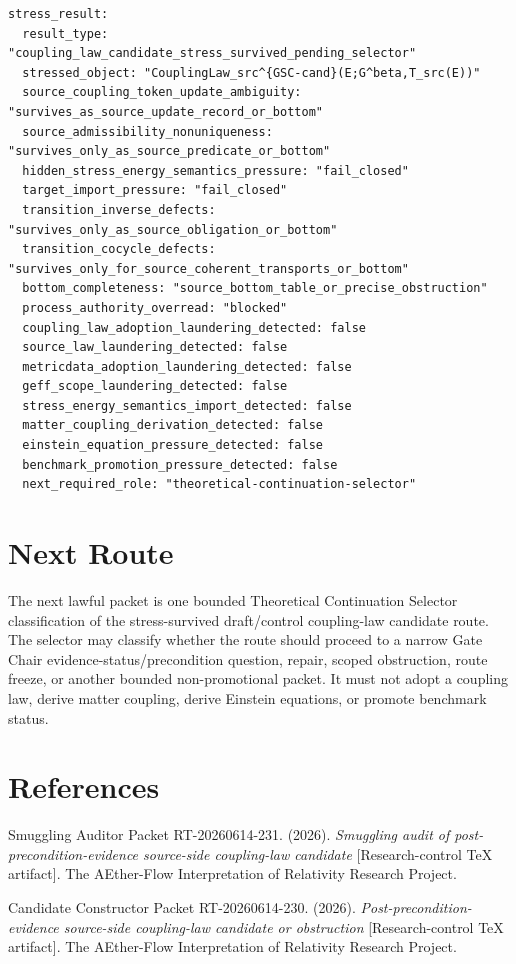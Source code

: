 \documentclass[11pt]{article}
\begin{document}
\begin{verbatim}
stress_result:
  result_type: "coupling_law_candidate_stress_survived_pending_selector"
  stressed_object: "CouplingLaw_src^{GSC-cand}(E;G^beta,T_src(E))"
  source_coupling_token_update_ambiguity: "survives_as_source_update_record_or_bottom"
  source_admissibility_nonuniqueness: "survives_only_as_source_predicate_or_bottom"
  hidden_stress_energy_semantics_pressure: "fail_closed"
  target_import_pressure: "fail_closed"
  transition_inverse_defects: "survives_only_as_source_obligation_or_bottom"
  transition_cocycle_defects: "survives_only_for_source_coherent_transports_or_bottom"
  bottom_completeness: "source_bottom_table_or_precise_obstruction"
  process_authority_overread: "blocked"
  coupling_law_adoption_laundering_detected: false
  source_law_laundering_detected: false
  metricdata_adoption_laundering_detected: false
  geff_scope_laundering_detected: false
  stress_energy_semantics_import_detected: false
  matter_coupling_derivation_detected: false
  einstein_equation_pressure_detected: false
  benchmark_promotion_pressure_detected: false
  next_required_role: "theoretical-continuation-selector"
\end{verbatim}

\section{Next Route}

The next lawful packet is one bounded Theoretical Continuation Selector
classification of the stress-survived draft/control coupling-law candidate
route. The selector may classify whether the route should proceed to a narrow
Gate Chair evidence-status/precondition question, repair, scoped obstruction,
route freeze, or another bounded non-promotional packet. It must not adopt a
coupling law, derive matter coupling, derive Einstein equations, or promote
benchmark status.

\section*{References}

Smuggling Auditor Packet RT-20260614-231. (2026). \textit{Smuggling audit of
post-precondition-evidence source-side coupling-law candidate}
[Research-control TeX artifact]. The AEther-Flow Interpretation of
Relativity Research Project.

Candidate Constructor Packet RT-20260614-230. (2026).
\textit{Post-precondition-evidence source-side coupling-law candidate or
obstruction} [Research-control TeX artifact]. The AEther-Flow Interpretation
of Relativity Research Project.
\end{document}
